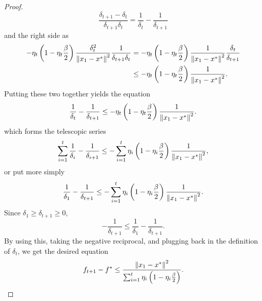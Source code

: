 \begin{proof}
    \begin{equation}
        \frac{\delta_{t+1} - \delta_t}{ \delta_{t+1}\delta_t} =
        \frac{1}{\delta_t} - \frac{1}{\delta_{t + 1}}
    \end{equation}
    and the right side as 
    \begin{equation}
        \begin{aligned}
        -\eta_t \left( 1 - \eta_t \frac{\beta}{2} \right) \frac{\delta_t^2}{\left\| x_1 - x^* \right\|^2}
            {\frac{1}{\delta_{t+1}\delta_t} } &= 
        -\eta_t \left( 1 - \eta_t \frac{\beta}{2} \right)
        \frac{1}{\left\| x_1 - x^* \right\|^2}
            {\frac{\delta_t}{\delta_{t+1}} } \\ &\leq
        -\eta_t \left( 1 - \eta_t \frac{\beta}{2} \right)
        \frac{ 1}{\left\| x_1 - x^* \right\|^2}.
        \end{aligned}
    \end{equation}
    Putting these two together yields the equation
    \begin{equation}
        \frac{1}{\delta_t} - \frac{1}{\delta_{t + 1}} \leq
        -\eta_t \left( 1 - \eta_t \frac{\beta}{2} \right)
        \frac{1}{\left\| x_1 - x^* \right\|^2}.
    \end{equation}
    which forms the telescopic series
    \begin{equation}
        \sum^{t}_{i=1} \frac{1}{\delta_i} - \frac{1}{\delta_{i + 1}} \leq
        -\sum^{t}_{i=1} \eta_i \left( 1 - \eta_i \frac{\beta}{2} \right)
        \frac{1}{\left\| x_1 - x^* \right\|^2},
    \end{equation}
    or put more simply
    \begin{equation}
       \frac{1}{\delta_1} - \frac{1}{\delta_{t + 1}} \leq
        -\sum^{t}_{i=1} \eta_i \left( 1 - \eta_i \frac{\beta}{2} \right)
        \frac{1}{\left\| x_1 - x^* \right\|^2}.
    \end{equation}
    Since $\delta_1 \geq \delta_{t+1} \geq 0$,
    \begin{equation}
        - \frac{1}{\delta_{t+1}} \leq \frac{1}{\delta_1} - \frac{1}{\delta_{t+1}}.
    \end{equation}
    By using this, taking the negative reciprocal, and plugging back in the
    definition of $\delta_t$, we get the desired equation
    \begin{equation}
      f_{t + 1} - f^* \leq
        \frac{\left\| x_1 - x^* \right\|^2}{\sum^{t}_{i=1} \eta_i \left( 1 - \eta_i \frac{\beta}{2} \right)}.
    \end{equation}
\end{proof}

